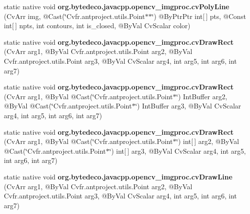 \begin{DoxyCompactItemize}
\item 
\mbox{\label{group__imgproc__c_ga8d56f25cdbdeddd56448cccc782a53c9}} 
static native void {\bfseries org.\+bytedeco.\+javacpp.\+opencv\+\_\+imgproc.\+cv\+Poly\+Line} (Cv\+Arr img, @Cast(\char`\"{}Cv\+fr.antproject.utils.Point$\ast$$\ast$\char`\"{}) @By\+Ptr\+Ptr int\mbox{[}$\,$\mbox{]} pts, @Const int\mbox{[}$\,$\mbox{]} npts, int contours, int is\+\_\+closed, @By\+Val Cv\+Scalar color)
\item 
\mbox{\label{group__imgproc__c_gaa50f6894ac882c1c6b6f03f0b682516b}} 
static native void {\bfseries org.\+bytedeco.\+javacpp.\+opencv\+\_\+imgproc.\+cv\+Draw\+Rect} (Cv\+Arr arg1, @By\+Val Cv\+fr.antproject.utils.Point arg2, @By\+Val Cv\+fr.antproject.utils.Point arg3, @By\+Val Cv\+Scalar arg4, int arg5, int arg6, int arg7)
\item 
\mbox{\label{group__imgproc__c_ga618ba0b2ac96b198bbad080682fb2d34}} 
static native void {\bfseries org.\+bytedeco.\+javacpp.\+opencv\+\_\+imgproc.\+cv\+Draw\+Rect} (Cv\+Arr arg1, @By\+Val @Cast(\char`\"{}Cv\+fr.antproject.utils.Point$\ast$\char`\"{}) Int\+Buffer arg2, @By\+Val @Cast(\char`\"{}Cv\+fr.antproject.utils.Point$\ast$\char`\"{}) Int\+Buffer arg3, @By\+Val Cv\+Scalar arg4, int arg5, int arg6, int arg7)
\item 
\mbox{\label{group__imgproc__c_gad670adc5c08b002cf341e436a43f406b}} 
static native void {\bfseries org.\+bytedeco.\+javacpp.\+opencv\+\_\+imgproc.\+cv\+Draw\+Rect} (Cv\+Arr arg1, @By\+Val @Cast(\char`\"{}Cv\+fr.antproject.utils.Point$\ast$\char`\"{}) int\mbox{[}$\,$\mbox{]} arg2, @By\+Val @Cast(\char`\"{}Cv\+fr.antproject.utils.Point$\ast$\char`\"{}) int\mbox{[}$\,$\mbox{]} arg3, @By\+Val Cv\+Scalar arg4, int arg5, int arg6, int arg7)
\item 
\mbox{\label{group__imgproc__c_ga82d012d0f4bcd24187d477e178c955b4}} 
static native void {\bfseries org.\+bytedeco.\+javacpp.\+opencv\+\_\+imgproc.\+cv\+Draw\+Line} (Cv\+Arr arg1, @By\+Val Cv\+fr.antproject.utils.Point arg2, @By\+Val Cv\+fr.antproject.utils.Point arg3, @By\+Val Cv\+Scalar arg4, int arg5, int arg6, int arg7)
\item 
\mbox{\label{group__imgproc__c_ga5adeb1e2425193097069276bb232445b}} 
$$
\end{DoxyCompactItemize}
